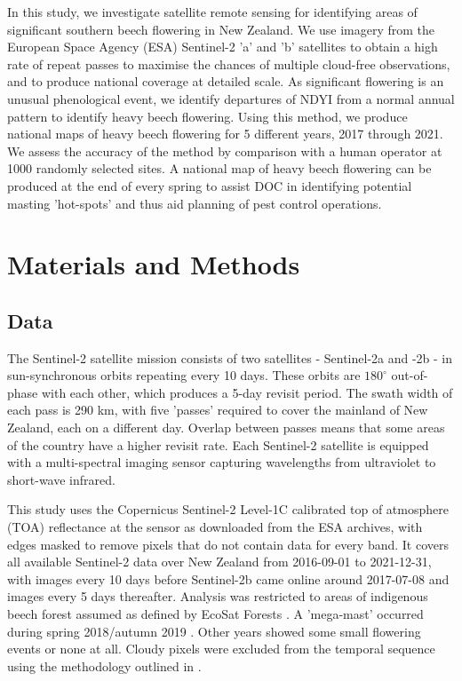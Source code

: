 \documentclass[remotesensing,article,submit,moreauthors,pdftex]{Definitions/mdpi}
\begin{document}
In this study, we investigate satellite remote sensing for identifying areas of significant southern beech flowering in New Zealand. We use imagery from the European Space
Agency (ESA) Sentinel-2 'a' and 'b' satellites to obtain a high rate of repeat passes to maximise the chances
of multiple cloud-free observations, and to produce national coverage at detailed scale. As significant flowering is an unusual phenological event, we identify departures of NDYI from a normal annual pattern to identify heavy beech flowering. Using this method, we produce national maps of heavy beech flowering for 5 different years, 2017 through 2021. We assess the accuracy of the method by comparison with a human operator at 1000 randomly selected sites. A national map of heavy beech flowering can be produced at the end of every spring to assist DOC in identifying
potential masting 'hot-spots' and thus aid planning of pest control operations. 
 

\section{Materials and Methods}

\subsection{Data}
The Sentinel-2 satellite mission consists of two satellites - Sentinel-2a and -2b - in sun-synchronous orbits
repeating every 10 days. These orbits are $180^\circ$ out-of-phase with each other, which produces a 5-day revisit period.
The swath width of each pass is 290 km, with five 'passes' required to cover the mainland of New Zealand, each on a different day.
Overlap between passes means that some areas of
the country have a higher revisit rate. Each Sentinel-2 satellite is equipped with a multi-spectral imaging sensor
capturing wavelengths from ultraviolet to short-wave infrared. 

This study uses the Copernicus Sentinel-2 Level-1C calibrated top of atmosphere (TOA) reflectance at the sensor as downloaded from the ESA
archives, with edges masked to remove pixels that do not contain data for every band. It covers all available Sentinel-2
data over New Zealand from 2016-09-01 to 2021-12-31, with images every 10 days before Sentinel-2b came online around
2017-07-08 and images every 5 days thereafter. Analysis was restricted to areas of indigenous beech forest assumed as defined by EcoSat Forests \citep{Shepherd2005,Dymond2004,ecosatnorth,ecosatsouth}. A 'mega-mast' occurred during
spring 2018/autumn 2019 \citep{DOC2019flowering, DOC2019}. Other years showed some small flowering events or none at all. Cloudy pixels were excluded from
the temporal sequence using the methodology outlined in \citep{Shepherd2020}.
\end{document}
